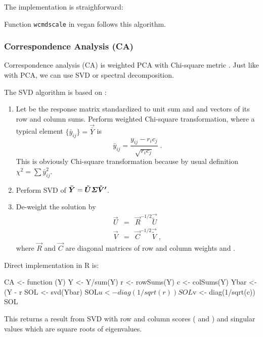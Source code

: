 The implementation is straighforward:
\begin{Schunk}
\end{Schunk}
Function \texttt{wcmdscale} in vegan follows this algorithm.

\subsubsection{Correspondence Analysis (CA)}

Correspondence analysis (CA) is weighted PCA with Chi-square metric
\citep{Nish80,Gree84, GreeHast87, Gree07}. Just like with
PCA, we can use SVD or spectral decomposition.

The SVD algorithm is based on \citet{GreeHast87}:
\begin{enumerate}
\item Let  be the response matrix standardized to unit sum and
   and  vectors of its row and column sums.  Perform
  weighted Chi-square transformation, where a typical element
  $\{\bar{y}_{ij}\} = \vec{\bar Y}$ is
  \begin{equation}
    \label{eq:CAstand}
    \bar{y}_{ij} = \frac{y_{ij} - r_i c_j}{\sqrt{r_i c_j}} \;.
  \end{equation}
  This is obviously Chi-square transformation because by usual
  definition $\chi^2 = \sum \bar{y}_{ij}^2$.
\item Perform SVD  of $\vec{\bar Y} = \vec{\tilde{U} \bSigma
    \tilde{V}'}$.
\item De-weight the solution by
  \begin{eqnarray}
    \vec{U}&=& \vec{R}^{-1/2} \vec{\tilde{U}}\\
    \vec{V}&=& \vec{C}^{-1/2} \vec{\tilde{V}} \;,
  \end{eqnarray}
  where $\vec{R}$ and $\vec{C}$ are diagonal matrices of row and
  column weights  and .
\end{enumerate}
Direct implementation in R is:
\begin{Schunk}
\begin{Soutput}
CA <-
function (Y) 
{
    Y <- Y/sum(Y)
    r <- rowSums(Y)
    c <- colSums(Y)
    Ybar <- (Y - r %o% c)/sqrt(r %o% c)
    SOL <- svd(Ybar)
    SOL$u <- diag(1/sqrt(r)) %*% SOL$u
    SOL$v <- diag(1/sqrt(c)) %*% SOL$v
    SOL
}
\end{Soutput}
\end{Schunk}
This returns a result from SVD with row and column scores ( and
) and singular values which are square roots of eigenvalues.

